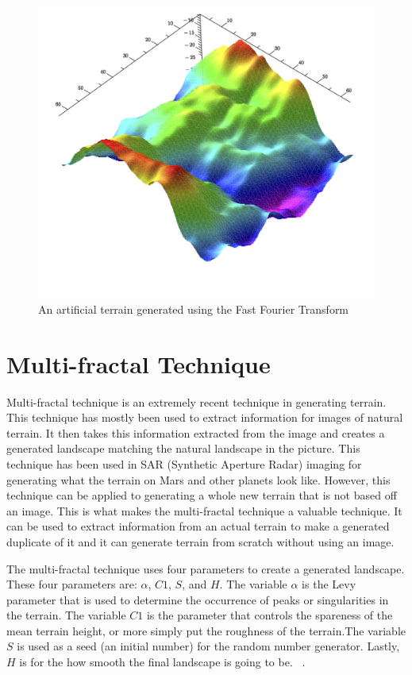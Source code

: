 \documentclass[11pt,twocolumn]{article}
\begin{document}
	\begin{figure}[ht]
	\includegraphics[scale=0.35]{FourierLandscape.jpg}
	\caption{An artificial terrain generated using the Fast Fourier Transform}
	\label{fig:fourier}
	\end{figure}

	\section{Multi-fractal Technique}
	\label{sec:multifractal}
	Multi-fractal technique is an extremely recent technique in generating terrain. This technique has mostly been used to
	extract information for images of natural terrain. It then takes this information extracted from the image and creates a generated
	landscape matching the natural landscape in the picture. This technique has been used in SAR (Synthetic Aperture Radar) imaging
	for generating what the terrain on Mars and other planets look like. However, this technique can be applied to generating a whole
	new terrain that is not based off an image.  This is what makes the multi-fractal technique a valuable technique. It can be used to
	extract information from an actual terrain to make a generated duplicate of it and it can generate terrain from scratch without
	using an image.
		
	The multi-fractal technique uses four parameters to create a generated landscape. These four parameters are: $\alpha$, $C1$, $S$,
	and $H$. The variable $\alpha$ is the Levy parameter that is used to determine the occurrence of peaks or singularities in the
	terrain. The variable $C1$ is the parameter that controls the spareness of the mean terrain height, or more simply put the
	roughness of the terrain.The variable $S$ is used as a seed (an initial number) for the random number generator. Lastly, $H$
	is for the how smooth the final landscape is going to be. ~\cite{PabstJense}.
	
\end{document}
